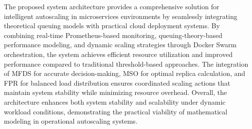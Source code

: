 The proposed system architecture provides a comprehensive solution for intelligent autoscaling in microservices environments by seamlessly integrating theoretical queuing models with practical cloud deployment systems. By combining real-time Prometheus-based monitoring, queuing-theory-based performance modeling, and dynamic scaling strategies through Docker Swarm orchestration, the system achieves efficient resource utilization and improved performance compared to traditional threshold-based approaches. The integration of MFDS for accurate decision-making, MSO for optimal replica calculation, and FPR for balanced load distribution ensures coordinated scaling actions that maintain system stability while minimizing resource overhead. Overall, the architecture enhances both system stability and scalability under dynamic workload conditions, demonstrating the practical viability of mathematical modeling in operational autoscaling systems.


